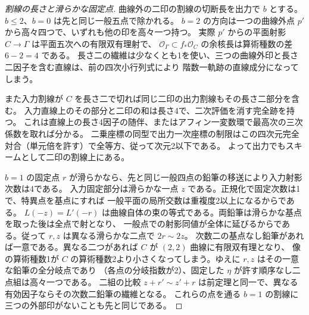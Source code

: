 \begin{proof}[割線の長さと滑らかな固定点]
曲線外の二印の割線の切断長を出力で $b$ とする。$b\le2$、$b=0$ は先と同じ一般五点で除かれる。
$b=2$ の方向は一つの曲線外点 $p'$ から高々四つで、いずれも他の印を高々一つ持つ。
実際 $p'$ からの平面射影 $C\to\Gamma$ は平面五次への有限双有理射で、
$\mathcal O_\Gamma\subset f_*\mathcal O_C$ の余核長は算術種数の差 $6-2=4$ である。
長さ二の繊維は少なくとも1を使い、三つの曲線外印と長さ二因子を含む直線は、前の四次小行列式により
階数一軌跡の直線成分になってしまう。

また入力割線が $C$ を長さ二で切れば同じ二印の出力割線もその長さ二部分を含む。
入力直線上のその部分と二印の和は長さ4で、二次評価を消す完全跡を持つ。
これは直線上の長さ4因子の随伴、またはアフィン一変数環で最高次の三次係数を取れば分かる。
二乗座標の同型で出力一次座標の制限はこの四次元完全対合（単元倍を許す）で全等方、従って次元2以下である。
よって出力でもスキームとして二印の割線上にある。

$b=1$ の固定点 $r$ が滑らかなら、先と同じ一般四点の鉛筆の移送により入力射影次数は4である。
入力固定部分は滑らかな一点 $z$ である。正規化で固定次数は1で、特異点を基点にすれば
一般平面の局所交数は重複度2以上になるからである。
$L(-z)=L'(-r)$ は曲線自体の束の等式である。両鉛筆は滑らかな基点を取った後は全点で射となり、
一般点での射影同値が全体に延びるからである。従って $r,z$ は異なる滑らかな二点で $2r\sim2z$。
次数二の基点なし鉛筆があれば一意である。異なる二つがあれば $C$ が $(2,2)$ 曲線に有限双有理となり、
像の算術種数1が $C$ の算術種数2より小さくなってしまう。ゆえに $r,z$ はその一意な鉛筆の全分岐点であり
（各点の分岐指数が2）、固定した $\eta$ が許す順序なし二点組は高々一つである。
二組の比較 $z+r'\sim z'+r$ は前定理と同一で、異なる有効因子ならその次数二鉛筆の繊維となる。
これらの点を通る $b=1$ の割線に三つの外部印がないことも先と同じである。
\end{proof}
